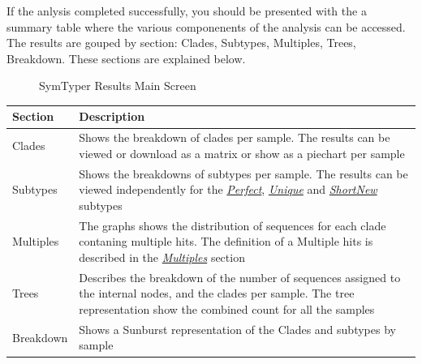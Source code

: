 \documentclass[letterpaper,10pt,english]{sphinxmanual}
\begin{document}
If the anlysis completed successfully, you should be presented with
the a summary table where the various componenents of the analysis
can be accessed. The results are gouped by section: Clades, Subtypes, Multiples, Trees, Breakdown. These sections are explained below.
\begin{figure}[htbp]
\centering
\capstart

\caption{SymTyper Results Main Screen}\label{Web:main-results-page}\end{figure}

\begin{tabulary}{\linewidth}{|L|L|}
\hline
\textsf{\relax 
Section
} & \textsf{\relax 
Description
}\\
\hline
Clades
 & 
Shows the breakdown of clades per sample. The results can be viewed or download as a matrix or show as a piechart per sample
\\

Subtypes
 & 
Shows the breakdowns of subtypes per sample. The results can be viewed independently for the {\hyperref[defs:perfect]{\emph{Perfect}}}, {\hyperref[defs:unique]{\emph{Unique}}} and  {\hyperref[defs:shortnew]{\emph{ShortNew}}} subtypes
\\

Multiples
 & 
The graphs shows the distribution of sequences for each clade contaning multiple hits. The definition of a Multiple hits is described in the {\hyperref[defs:multiples]{\emph{Multiples}}} section
\\

Trees
 & 
Describes the breakdown of the number of sequences assigned to the internal nodes, and the clades per sample. The tree representation show the combined count for all
the samples
\\

Breakdown
 & 
Shows a Sunburst representation of the Clades and subtypes by sample
\\
\hline\end{tabulary}
\end{document}
